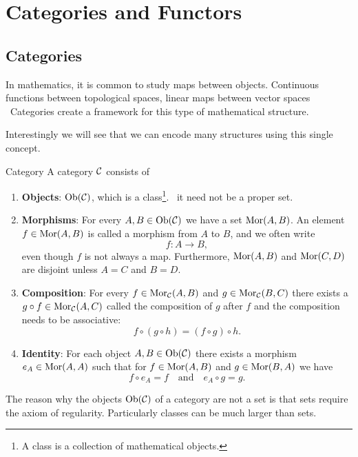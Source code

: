 \chapter{Categories and Functors}
\section{Categories}

In mathematics, it is common to study maps between objects.
Continuous functions between topological spaces, linear maps between vector spaces \etc\
Categories create a framework for this type of mathematical structure.

Interestingly we will see that we can encode many structures using this single concept.

\begin{definition}{Category \cite[Section~1.2]{Roman2017}}{}
A category $\mathcal{C}$ consists of
\begin{enumerate}
    \item \textbf{Objects}: $\mathrm {Ob}(\mathcal{C})$, which is a class\footnote{A class is a collection of mathematical objects.}. \Ie\ it need not be a proper set.
    
    \item \textbf{Morphisms}: For every $A, B \in \mathrm {Ob}(\mathcal{C})$ we have a set $\mathrm {Mor}(A,B)$. An element $f \in \mathrm {Mor}(A,B)$ is called a morphism from $A$ to $B$, and we often write 
    $$
    f: A \to B,
    $$
    even though $f$ is not always a map. Furthermore, $\mathrm {Mor}(A,B)$ and $\mathrm {Mor}(C,D)$ are disjoint unless $A = C$ and $B = D$.
    
    \item \textbf{Composition}: For every $f \in \mathrm {Mor}_{\mathcal{C}}(A,B)$ and $g \in \mathrm {Mor}_{\mathcal{C}}(B,C)$ there exists a $g \circ f \in \mathrm {Mor}_{\mathcal{C}}(A,C)$ called the composition of $g$ after $f$ and the composition needs to be associative: 
    $$
    f \circ (g \circ h) = (f \circ g) \circ h.
    $$

    \item \textbf{Identity}: For each object $A,B \in \mathrm {Ob}(\mathcal{C})$ there exists a morphism $e_A \in \mathrm {Mor}(A,A)$ such that for $f \in \mathrm {Mor}(A,B)$ and $g \in \mathrm {Mor}(B,A)$ we have
    $$
    f \circ e_A = f \quad \text{and} \quad e_A \circ g = g.
    $$
\end{enumerate}
\end{definition}

The reason why the objects $\mathrm {Ob}(\mathcal{C})$ of a category are not a set is that sets require the axiom of regularity. Particularly classes can be much larger than sets.

